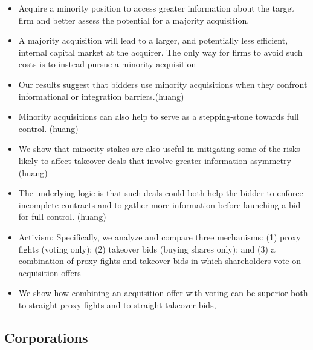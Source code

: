 \documentclass[12pt]{article}
\begin{document}
\begin{itemize}
    \item Acquire a minority position to access greater information about the target firm and better assess the potential for a majority acquisition. \citep{Ouimet2013}

    \item A majority acquisition will lead to a larger, and potentially less efficient, internal capital market at the acquirer. The only way for firms to avoid such costs is to instead pursue a minority acquisition \citep{Ouimet2013}

    \item Our results suggest that bidders use minority acquisitions when they confront informational or integration barriers.(huang)

    \item Minority acquisitions can also help to serve as a stepping-stone towards full control. (huang)

    \item We show that minority stakes are also useful in mitigating some of the risks likely to affect takeover deals that involve greater information asymmetry (huang)

    \item The underlying logic is that such deals could both help the bidder to enforce incomplete contracts and to gather more information before launching a bid for full control. (huang)

    \item Activism: Specifically, we analyze and compare three mechanisms: (1) proxy fights (voting only); (2) takeover bids (buying shares only); and (3) a combination of proxy fights and takeover bids in which shareholders vote on acquisition offers \citep{Arlen2001}

    \item We show how combining an acquisition offer with voting can be superior both to straight proxy fights and to straight takeover bids, \citep{Arlen2001}
\end{itemize}
\subsection{Corporations}
\end{document}
